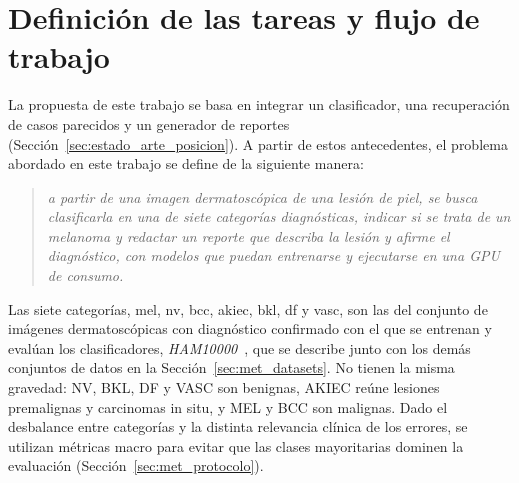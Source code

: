 \section{Definición de las tareas y flujo de trabajo}
\label{sec:met_tareas}

La propuesta de este trabajo se basa en integrar un clasificador, una recuperación de casos parecidos y un generador
de reportes (Sección~\ref{sec:estado_arte_posicion}). A partir de estos antecedentes, el problema abordado en este trabajo se define de la siguiente manera:
\begin{quote}
    \emph{a partir de una imagen dermatoscópica de una lesión de piel, se busca clasificarla en una de siete categorías
    diagnósticas, indicar si se trata de un melanoma y redactar un reporte que describa la lesión y afirme el
    diagnóstico, con modelos que puedan entrenarse y ejecutarse en una GPU de consumo.}
\end{quote}

Las siete categorías, \gls{mel}, \gls{nv}, \gls{bcc}, \gls{akiec}, \gls{bkl}, \gls{df} y \gls{vasc}, son las del conjunto de imágenes dermatoscópicas con diagnóstico confirmado con el que se entrenan y evalúan los clasificadores, \emph{HAM10000}~\cite{tschandl2018ham10000}, que se describe junto con los demás conjuntos de datos en la Sección~\ref{sec:met_datasets}. No tienen la misma gravedad: NV, BKL, DF y VASC son benignas, AKIEC reúne lesiones premalignas y
carcinomas in situ, y MEL y BCC son malignas. Dado el desbalance entre categorías y la distinta relevancia clínica de los errores, se utilizan métricas macro para evitar que las clases mayoritarias dominen la evaluación (Sección~\ref{sec:met_protocolo}).


